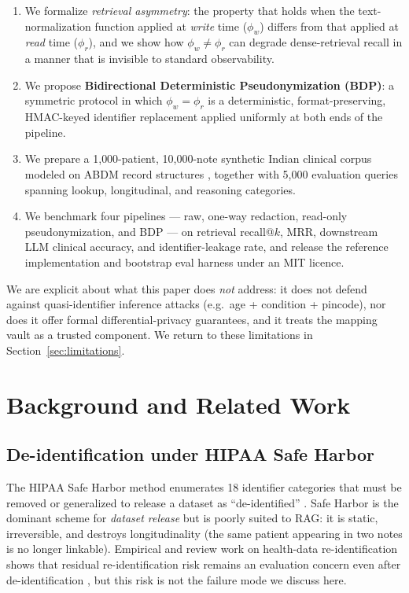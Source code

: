 \documentclass[11pt,a4paper]{article}
\begin{document}
\begin{enumerate}
  \item We formalize \emph{retrieval asymmetry}: the property that holds when
        the text-normalization function applied at \emph{write} time
        ($\phi_w$) differs from that applied at \emph{read} time ($\phi_r$),
        and we show how $\phi_w \neq \phi_r$ can degrade dense-retrieval
        recall in a manner that is invisible to standard observability.
  \item We propose \textbf{Bidirectional Deterministic Pseudonymization
        (BDP)}: a symmetric protocol in which $\phi_w = \phi_r$ is a
        deterministic, format-preserving, HMAC-keyed identifier replacement
        applied uniformly at both ends of the pipeline.
  \item We prepare a 1{,}000-patient, 10{,}000-note synthetic Indian
        clinical corpus modeled on ABDM record structures
        \cite{abdm_specs_2024}, together with 5{,}000 evaluation queries
        spanning lookup, longitudinal, and reasoning categories.
  \item We benchmark four pipelines --- raw, one-way redaction, read-only
        pseudonymization, and BDP --- on retrieval recall@$k$, MRR,
        downstream LLM clinical accuracy, and identifier-leakage rate, and
        release the reference implementation and bootstrap eval harness
        under an MIT licence.
\end{enumerate}

We are explicit about what this paper does \emph{not} address: it does not
defend against quasi-identifier inference attacks (e.g.\ age + condition +
pincode), nor does it offer formal differential-privacy guarantees, and it
treats the mapping vault as a trusted component. We return to these
limitations in Section~\ref{sec:limitations}.

\section{Background and Related Work}
\label{sec:related}

\subsection{De-identification under HIPAA Safe Harbor}

The HIPAA Safe Harbor method enumerates 18 identifier categories that must
be removed or generalized to release a dataset as ``de-identified''
\cite{hhs_hipaa_deid_guidance}. Safe Harbor is the dominant scheme for
\emph{dataset release} but is poorly suited to RAG: it is static,
irreversible, and destroys longitudinality (the same patient appearing in
two notes is no longer linkable). Empirical and review work on health-data
re-identification shows that residual re-identification risk remains an
evaluation concern even after de-identification
\cite{benitez2010,el_emam_2011}, but this risk is not the failure mode we
discuss here.
\end{document}
